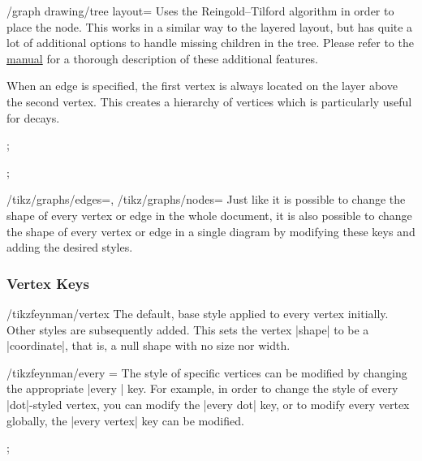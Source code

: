 \documentclass[a4paper,final]{ltxdoc}
\providecommand{\pgfmanual}{\href{http://mirrors.ctan.org/graphics/pgf/base/doc/pgfmanual.pdf}{\tikzname{} manual}}
\begin{document}
\begin{key}{/graph drawing/tree layout=}
  Uses the Reingold--Tilford algorithm in order to place the node.  This works in a similar way to the layered layout, but has quite a lot of additional options to handle missing children in the tree.  Please refer to the \pgfmanual{} for a thorough description of these additional features.

  When an edge is specified, the first vertex is always located on the layer above the second vertex.  This creates a hierarchy of vertices which is particularly useful for decays.

\begin{codeexample}[]
;
\end{codeexample}
\begin{codeexample}[]
;
\end{codeexample}
\end{key}

\begin{keylist}{%
  /tikz/graphs/edges=,
  /tikz/graphs/nodes=}
  Just like it is possible to change the shape of every vertex or edge in the whole document, it is also possible to change the shape of every vertex or edge in a single diagram by modifying these keys and adding the desired styles.
\end{keylist}

\subsubsection{Vertex Keys}
\label{subsubsec:vertex_keys}

\begin{key}{/tikzfeynman/vertex}
  The default, base style applied to every vertex initially.  Other styles are subsequently added.  This sets the vertex |shape| to be a |coordinate|, that is, a null shape with no size nor width.
\end{key}

\begin{key}{/tikzfeynman/every =}
  The style of specific vertices can be modified by changing the appropriate |every | key.  For example, in order to change the style of every |dot|-styled vertex, you can modify the |every dot| key, or to modify every vertex globally, the |every vertex| key can be modified.

\begin{codeexample}[]
;
\end{codeexample}
\end{key}
\end{document}
